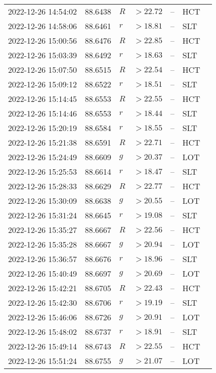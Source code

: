 \documentclass{nature_plusfigure}
\begin{document}
\begin{supplement}
\begin{center}
\begin{longtable}{lllllll}
2022-12-26 14:54:02 & 88.6438 & $R$ & $>22.72$ & -- & HCT &  \\ 
2022-12-26 14:58:06 & 88.6461 & $r$ & $>18.81$ & -- & SLT &  \\ 
2022-12-26 15:00:56 & 88.6476 & $R$ & $>22.85$ & -- & HCT &  \\ 
2022-12-26 15:03:39 & 88.6492 & $r$ & $>18.63$ & -- & SLT &  \\ 
2022-12-26 15:07:50 & 88.6515 & $R$ & $>22.54$ & -- & HCT &  \\ 
2022-12-26 15:09:12 & 88.6522 & $r$ & $>18.51$ & -- & SLT &  \\ 
2022-12-26 15:14:45 & 88.6553 & $R$ & $>22.55$ & -- & HCT &  \\ 
2022-12-26 15:14:46 & 88.6553 & $r$ & $>18.44$ & -- & SLT &  \\ 
2022-12-26 15:20:19 & 88.6584 & $r$ & $>18.55$ & -- & SLT &  \\ 
2022-12-26 15:21:38 & 88.6591 & $R$ & $>22.71$ & -- & HCT &  \\ 
2022-12-26 15:24:49 & 88.6609 & $g$ & $>20.37$ & -- & LOT &  \\ 
2022-12-26 15:25:53 & 88.6614 & $r$ & $>18.47$ & -- & SLT &  \\ 
2022-12-26 15:28:33 & 88.6629 & $R$ & $>22.77$ & -- & HCT &  \\ 
2022-12-26 15:30:09 & 88.6638 & $g$ & $>20.55$ & -- & LOT &  \\ 
2022-12-26 15:31:24 & 88.6645 & $r$ & $>19.08$ & -- & SLT &  \\ 
2022-12-26 15:35:27 & 88.6667 & $R$ & $>22.56$ & -- & HCT &  \\ 
2022-12-26 15:35:28 & 88.6667 & $g$ & $>20.94$ & -- & LOT &  \\ 
2022-12-26 15:36:57 & 88.6676 & $r$ & $>18.96$ & -- & SLT &  \\ 
2022-12-26 15:40:49 & 88.6697 & $g$ & $>20.69$ & -- & LOT &  \\ 
2022-12-26 15:42:21 & 88.6705 & $R$ & $>22.43$ & -- & HCT &  \\ 
2022-12-26 15:42:30 & 88.6706 & $r$ & $>19.19$ & -- & SLT &  \\ 
2022-12-26 15:46:06 & 88.6726 & $g$ & $>20.91$ & -- & LOT &  \\ 
2022-12-26 15:48:02 & 88.6737 & $r$ & $>18.91$ & -- & SLT &  \\ 
2022-12-26 15:49:14 & 88.6743 & $R$ & $>22.55$ & -- & HCT &  \\ 
2022-12-26 15:51:24 & 88.6755 & $g$ & $>21.07$ & -- & LOT &  \\ 

\end{longtable}
\end{center}
\end{supplement}
\end{document}
